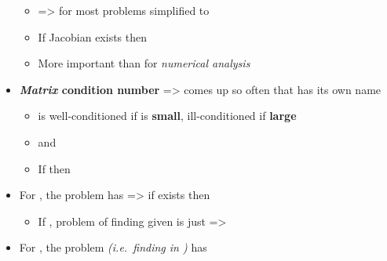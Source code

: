 \begin{itemize}
        \begin{itemize}

          \item
                =\textgreater{} for most problems simplified to
          \item
                If Jacobian  exists then
          \item
                More important than \iMbox{\hat{\kappa}} for \emph{numerical
                  analysis}
        \end{itemize}
  \item
        \textbf{\emph{Matrix} condition number}
        =\textgreater{} comes up so often that has its own name

        \begin{itemize}

          \item
                 is well-conditioned if
                 is \textbf{small}, ill-conditioned if
                \textbf{large}
          \item
                 and
          \item
                If  then
        \end{itemize}
  \item
        For , the problem
         has
         =\textgreater{} if
         exists then 

        \begin{itemize}

          \item
                If , problem of finding  given  is
                just  =\textgreater{}
        \end{itemize}
  \item
        For , the problem
         \emph{(i.e.~finding
           in )} has
\end{itemize}

